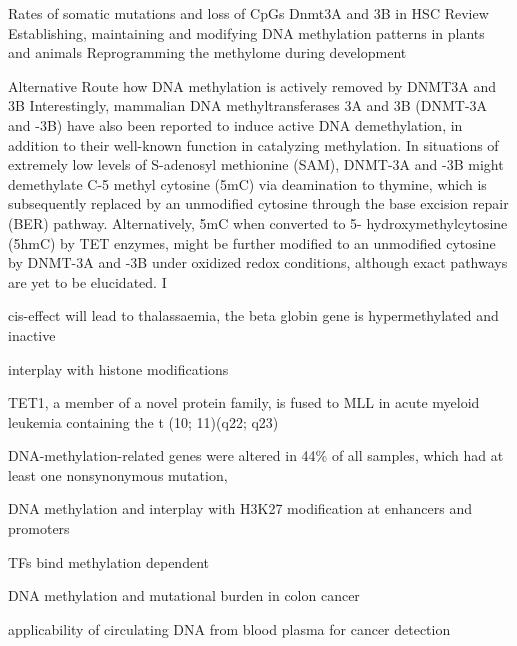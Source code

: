 Rates of somatic mutations and loss of CpGs\cite{Behjati2014}
Dnmt3A and 3B in HSC\cite{Challen2014}
Review Establishing, maintaining and modifying DNA methylation patterns in plants and animals \cite{Law2010}
Reprogramming the methylome during development\cite{Lee2014}


Alternative Route how DNA methylation is actively removed by DNMT3A and 3B
Interestingly, mammalian DNA methyltransferases 3A and 3B (DNMT-3A and -3B) have also been reported to induce active DNA demethylation, in addition to their well-known function in catalyzing methylation. In situations of extremely low levels of S-adenosyl methionine (SAM), DNMT-3A and -3B might demethylate C-5 methyl cytosine (5mC) via deamination to thymine, which is subsequently replaced by an unmodified cytosine through the base excision repair (BER) pathway. Alternatively, 5mC when converted to 5- hydroxymethylcytosine (5hmC) by TET enzymes, might be further modified to an unmodified cytosine by DNMT-3A and -3B under oxidized redox conditions, although exact pathways are yet to be elucidated. I


cis-effect will lead to thalassaemia, the beta globin gene is hypermethylated and inactive\cite{Kioussis1983}

interplay with histone modifications \cite{Putiri2014}

TET1, a member of a novel protein family, is fused to MLL in acute myeloid leukemia containing the t (10; 11)(q22; q23) \cite{Lorsbach2003}

DNA-methylation-related genes were altered in 44\% of all samples, which had at least one nonsynonymous mutation\cite{TCGAC2013}, 

DNA methylation and interplay with H3K27 modification at enhancers and promoters\cite{King2016a}

TFs bind methylation dependent\cite{Yin2017a}

DNA methylation and mutational burden in colon cancer\cite{Poulos2017}

applicability of circulating DNA from blood plasma for cancer detection\cite{Shen2018}


